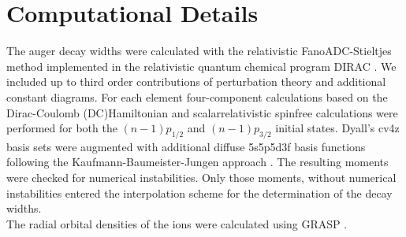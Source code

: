 \section{Computational Details}
\label{section:computational}
The auger decay widths were calculated with the relativistic FanoADC-Stieltjes
method
implemented in the relativistic quantum chemical program DIRAC \cite{DIRAC17}.
We included up to third order contributions of perturbation theory and additional
constant diagrams.
For each element four-component calculations based on the
Dirac-Coulomb (DC)Hamiltonian
and scalarrelativistic spinfree calculations were
performed for both the $(n-1)p_{1/2}$ and $(n-1)p_{3/2}$ initial states.
Dyall's cv4z basis sets \cite{Dyall4s-7s09} were augmented with additional diffuse
5s5p5d3f
basis functions following the Kaufmann-Baumeister-Jungen approach
\cite{Kaufmann89}.
The resulting moments were checked for numerical instabilities.
Only those moments, without numerical instabilities entered the interpolation
scheme for the determination of the decay widths.\\
The radial orbital densities of the ions were calculated using GRASP
\cite{Parpia96,xyz}.
